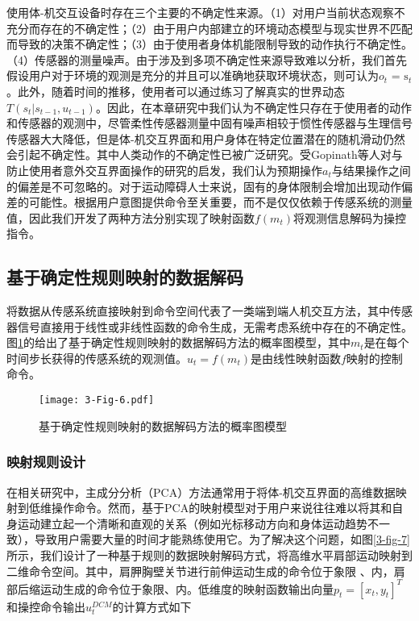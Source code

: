 使用体-机交互设备时存在三个主要的不确定性来源。（1）对用户当前状态观察不充分而存在的不确定性；（2）由于用户内部建立的环境动态模型与现实世界不匹配而导致的决策不确定性；（3）由于使用者身体机能限制导致的动作执行不确定性。（4）传感器的测量噪声。由于涉及到多项不确定性来源导致难以分析，我们首先假设用户对于环境的观测是充分的并且可以准确地获取环境状态，则可认为${o_t}{\text{ = }}{{\text{s}}_t}$。此外，随着时间的推移，使用者可以通过练习了解真实的世界动态$T({s_t}|{s_{t - 1}},{u_{t - 1}})$。因此，在本章研究中我们认为不确定性只存在于使用者的动作和传感器的观测中，尽管柔性传感器测量中固有噪声相较于惯性传感器与生理信号传感器大大降低，但是体-机交互界面和用户身体在特定位置潜在的随机滑动仍然会引起不确定性。其中人类动作的不确定性已被广泛研究\cite{churchlandCentralSourceMovement2006,vanbeersRoleExecutionNoise2004, desantisGuidingFunctionalReorganization2020a}。受Gopinath等人对与防止使用者意外交互界面操作的研究\cite{gopinathCustomizedHandlingUnintended2021}的启发，我们认为预期操作$a_t$与结果操作之间的偏差是不可忽略的。对于运动障碍人士来说，固有的身体限制会增加出现动作偏差的可能性。根据用户意图提供命令至关重要，而不是仅仅依赖于传感系统的测量值，因此我们开发了两种方法分别实现了映射函数$f(m_t)$将观测信息解码为操控指令。  

\subsection{基于确定性规则映射的数据解码}
将数据从传感系统直接映射到命令空间代表了一类端到端人机交互方法，其中传感器信号直接用于线性或非线性函数的命令生成，无需考虑系统中存在的不确定性。图\ref{3-fig-6}的给出了基于确定性规则映射的数据解码方法的概率图模型，其中${m_t}$是在每个时间步长获得的传感系统的观测值。${{u}_t} = f({{m}_t})$是由线性映射函数$f$映射的控制命令。

\begin{figure}[!t]
    \centering
    \texttt{[image: 3-Fig-6.pdf]}
    \caption{基于确定性规则映射的数据解码方法的概率图模型}
    \label{3-fig-6}
\end{figure} 

\subsubsection{映射规则设计}
在相关研究中，主成分分析（PCA）方法通常用于将体-机交互界面的高维数据映射到低维操作命令\cite{casadioBodyMachineInterface2011,seanez-gonzalezStaticDynamicDecoding2017}。然而，基于PCA的映射模型对于用户来说往往难以将其和自身运动建立起一个清晰和直观的关系（例如光标移动方向和身体运动趋势不一致），导致用户需要大量的时间才能熟练使用它。为了解决这个问题，如图\ref{3-fig-7}所示，我们设计了一种基于规则的数据映射解码方式，将高维水平肩部运动映射到二维命令空间。其中，肩胛胸壁关节进行前伸运动生成的命令位于象限 \uppercase\expandafter{}、\uppercase\expandafter{}内，肩部后缩运动生成的命令位于象限\uppercase\expandafter{}、\uppercase\expandafter{}内。低维度的映射函数输出向量${p_t} = {[{x_t},{y_t}]^T}$和操控命令输出$u_t^{DCM}$的计算方式如下

